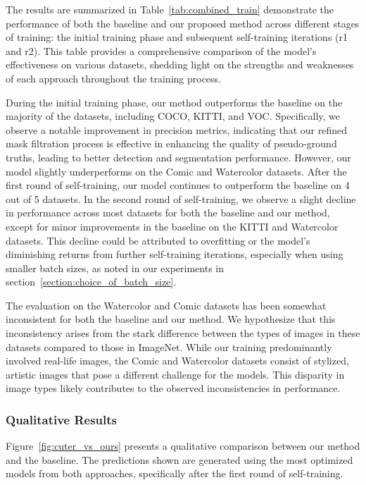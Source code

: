 The results are summarized in Table~\ref{tab:combined_train} demonstrate the performance of both the baseline and our proposed method across different stages of training: the initial training phase and subsequent self-training iterations (r1 and r2). This table provides a comprehensive comparison of the model’s effectiveness on various datasets, shedding light on the strengths and weaknesses of each approach throughout the training process. 

During the initial training phase, our method outperforms the baseline on the majority of the datasets, including COCO, KITTI, and VOC. Specifically, we observe a notable improvement in precision metrics, indicating that our refined mask filtration process is effective in enhancing the quality of pseudo-ground truths, leading to better detection and segmentation performance. However, our model slightly underperforms on the Comic and Watercolor datasets. After the first round of self-training, our model continues to outperform the baseline on 4 out of 5 datasets. In the second round of self-training, we observe a slight decline in performance across most datasets for both the baseline and our method, except for minor improvements in the baseline on the KITTI and Watercolor datasets. This decline could be attributed to overfitting or the model’s diminishing returns from further self-training iterations, especially when using smaller batch sizes, as noted in our experiments in section~\ref{section:choice_of_batch_size}.

The evaluation on the Watercolor and Comic datasets has been somewhat inconsistent for both the baseline and our method. We hypothesize that this inconsistency arises from the stark difference between the types of images in these datasets compared to those in ImageNet. While our training predominantly involved real-life images, the Comic and Watercolor datasets consist of stylized, artistic images that pose a different challenge for the models. This disparity in image types likely contributes to the observed inconsistencies in performance.

\subsubsection{Qualitative Results}

Figure~\ref{fig:cuter_vs_ours} presents a qualitative comparison between our method and the baseline. The predictions shown are generated using the most optimized models from both approaches, specifically after the first round of self-training.

